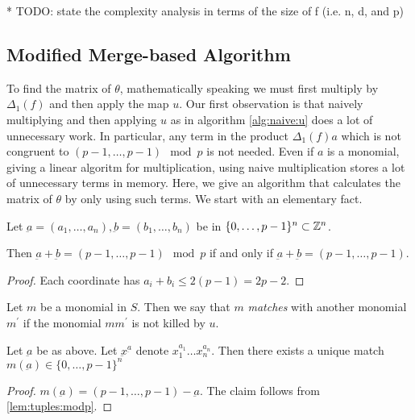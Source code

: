 * TODO: state the complexity analysis in terms of the size of f (i.e. n, d, and p)

\subsection{Modified Merge-based Algorithm}

To find the matrix of \(\theta\), mathematically
speaking we must first multiply by \(\Delta_{1}(f)\) 
and then apply the map \(u\).
Our first observation is that naively 
multiplying and then applying \(u\) 
as in algorithm \ref{alg:naive:u}
does a lot of unnecessary work.
In particular, any term in the 
product \(\Delta_{1}(f)a\) which 
is not congruent to 
\((p-1, \ldots, p-1) \mod p\)
is not needed. 
Even if \(a\) is a monomial, giving a linear
algoritm for multiplication, using naive
multiplication stores a lot of unnecessary terms
in memory.
Here, we give an algorithm that calculates
the matrix of \(\theta\) by only
using such terms.
We start with an elementary fact.

\begin{lem}
	\label{lem:tuples:modp}
	Let \(\underbar{a} = (a_{1}, \ldots, a_{n}),
	\underbar{b} = (b_{1}, \ldots, b_{n})\)
	be in \(\{0, \ldots, p-1\}^{n} \subset \mathbb{Z}^{n}\).

	Then \(\underbar{a} + \underbar{b} = 
	(p-1, \ldots, p-1) \mod p\)
	if and only if 
	\(\underbar{a} + \underbar{b} = 
	(p-1, \ldots, p-1)\).
\end{lem}

\begin{proof}
	Each coordinate has \(a_{i} + b_{i} \leq 2(p-1) = 2p-2\).
\end{proof}

\begin{defn}
	Let \(m\) be a monomial in \(S\). 
	Then we say that \(m\) \textit{matches}
	with another monomial \(m^{\prime}\) 
	if the monomial \(mm^{\prime}\) is
	not killed by \(u\).
\end{defn}

\begin{cor}
	Let \(\underbar{a}\) be as above.
	Let \(\underbar{x}^{\underbar{a}}\)
	denote \(x_{1}^{a_{1}} \ldots x_{n}^{a_{n}}\).
	Then there exists a unique
	match \(m(\underbar{a}) \in \{0, \ldots, p-1\}^{n}\) 
\end{cor}

\begin{proof}
	\(m(\underbar{a}) = 
	(p-1, \ldots, p-1) - \underbar{a}\).
	The claim follows from 
	\ref{lem:tuples:modp}.
\end{proof}

